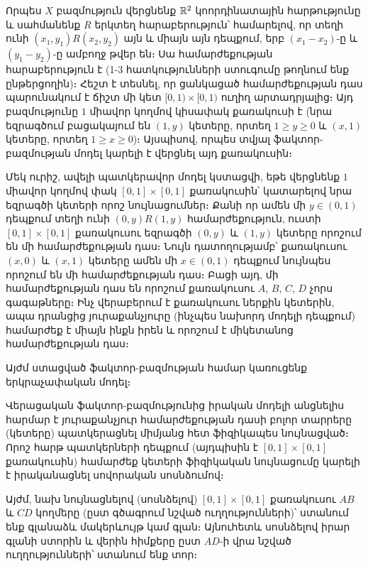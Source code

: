 \documentclass[./main.tex]{subfiles}
\begin{document}
\begin{example}\label{ch2ex10} 
Որպես $X$ բազմություն վերցնենք $\mathbb{R}^2$ կոորդինատային հար\-թու\-թյունը և սահմանենք $R$ երկտեղ հարաբերություն՝ համարելով, որ տեղի ունի \linebreak $(x_1,y_1)R(x_2,y_2)$ այն և միայն այն դեպքում, երբ $(x_1-x_2)$-ը և $(y_1-y_2)$-ը ամբողջ թվեր են։ Սա համարժեքության հարաբերություն է (1-3 հատկությունների ստուգումը թողնում ենք ընթերցողին)։ Հեշտ է տեսնել, որ ցանկացած համարժեքության դաս պա\-րու\-նա\-կում է ճիշտ մի կետ $[0,1) \times [0,1)$ ուղիղ արտադրյալից։ Այդ բազմությունը $1$ միավոր կողմով կիսափակ քառակուսի է (նրա եզրագծում բացակայում են $(1,y)$ կետերը, որտեղ $1\geq y\geq 0$ և $(x,1)$ կետերը, որտեղ $ 1\geq x\geq 0$)։ Այսպիսով, որպես տվյալ ֆակտոր-բազմության մոդել կարելի է վերցնել այդ քառակուսին։
\par Մեկ ուրիշ, ավելի պատկերավոր մոդել կստացվի, եթե վերցնենք $1$ միավոր կողմով փակ $[0,1]\times [0,1]$ քառակուսին՝ կատարելով նրա եզրագծի կետերի որոշ նույնացումներ։
Քանի որ ամեն մի $y\in(0,1)$ դեպքում տեղի ունի $(0,y)R(1,y)$ համար\-ժե\-քու\-թյուն, ուստի $[0,1]\times[0,1]$ քառակուսու եզրագծի $(0,y)$ և $(1,y)$ կետերը որոշում են մի համար\-ժե\-քության դաս։ Նույն դատողությամբ՝ քառակուսու $(x,0)$ և $(x,1)$ կետերը ամեն մի $x\in(0,1)$ դեպքում նույնպես որոշում են մի համարժեքության դաս։ Բացի այդ, մի համարժեքության դաս են որոշում քառակուսու $A$, $B$, $C$, $D$ չորս գագաթները։ Ինչ վերաբերում է քառակուսու ներքին կետերին, ապա դրանցից յուրաքանչյուրը (ինչպես նախորդ մոդելի դեպքում) համարժեք է միայն ինքն իրեն և որոշում է միկետանոց համարժեքության դաս։
\par Այժմ ստացված ֆակտոր-բազմության համար կառուցենք երկրաչափական մո\-դել։
\par Վերացական ֆակտոր-բազմությունից իրական մոդելի անցնելիս հարմար է յու\-րա\-քան\-չյուր համարժեքության դասի բոլոր տարրերը (կետերը) պատկերացնել մի\-մյանց հետ ֆիզիկապես նույնացված։ Որոշ հարթ պատկերների դեպքում (այդպիսին է $[0,1]\times[0,1]$ քառակուսին) համարժեք կետերի ֆիզիկական նույնացումը կարելի է իրականացնել սովորական սոսնձումով։
\par Այժմ, նախ նույնացնելով (սոսնձելով) $[0,1]\times[0,1]$ քառակուսու $AB$ և $CD$ կող\-մե\-րը (ըստ գծագրում նշված ուղղությունների)՝ ստանում ենք գլանաձև մակերևույթ կամ գլան։ Այնուհետև սոսնձելով իրար գլանի ստորին և վերին հիմքերը ըստ $AD$-ի վրա նշված ուղղությունների՝ ստանում ենք տոր։

\begin{center}
\begin{tikzpicture}


\end{tikzpicture}
\end{center}
\end{example}
\end{document}
